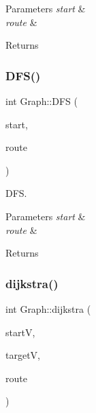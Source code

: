 \begin{DoxyParams}{Parameters}
{\em start} & \\
\hline
{\em route} & \\
\hline
\end{DoxyParams}
\begin{DoxyReturn}{Returns}

\end{DoxyReturn}
\mbox{\label{class_graph_ad724e3eb5c87319985f9c4bb1ca8ee1e}} 
\subsubsection{\texorpdfstring{D\+F\+S()}{DFS()}}
{\footnotesize\ttfamily int Graph\+::\+D\+FS (\begin{DoxyParamCaption}\item[{Q\+String}]{start,  }\item[{std\+::vector$<$ Q\+String $>$ $\ast$}]{route }\end{DoxyParamCaption})}



D\+FS. 


\begin{DoxyParams}{Parameters}
{\em start} & \\
\hline
{\em route} & \\
\hline
\end{DoxyParams}
\begin{DoxyReturn}{Returns}

\end{DoxyReturn}
\mbox{\label{class_graph_af88e687c2cefcdad584a64f52c98824e}} 
\subsubsection{\texorpdfstring{dijkstra()}{dijkstra()}}
{\footnotesize\ttfamily int Graph\+::dijkstra (\begin{DoxyParamCaption}\item[{Q\+String}]{startV,  }\item[{Q\+String}]{targetV,  }\item[{std\+::vector$<$ Q\+String $>$ $\ast$}]{route }\end{DoxyParamCaption})}



